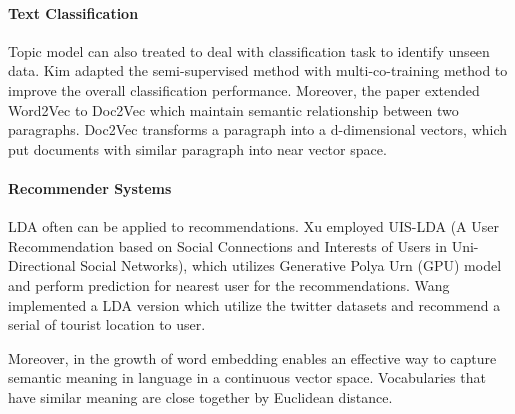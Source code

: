 \paragraph{Text Classification}Topic model can also treated to deal with classification task to identify unseen data. Kim \cite{kim_multi-co-training_2019} adapted the semi-supervised method with multi-co-training method to improve the overall classification performance. Moreover, the paper extended Word2Vec to Doc2Vec which maintain semantic relationship between two paragraphs. Doc2Vec transforms a paragraph into a d-dimensional vectors, which put documents with similar paragraph into near vector space.
\paragraph{Recommender Systems} LDA often can be applied to recommendations. Xu\cite{xu_uis-lda_2017} employed UIS-LDA (A User Recommendation based on Social Connections and Interests of Users in Uni-Directional Social Networks), which utilizes Generative Polya Urn (GPU) model and perform prediction for nearest user for the recommendations. Wang \cite{wang_st-sage_2017} implemented a LDA version which utilize the twitter datasets and recommend a serial of tourist location to user.

Moreover, in the growth of word embedding \cite{mikolov_distributed_2013} enables an effective way to capture semantic meaning in language in a continuous vector space. Vocabularies that have similar meaning are close together by Euclidean distance. 

